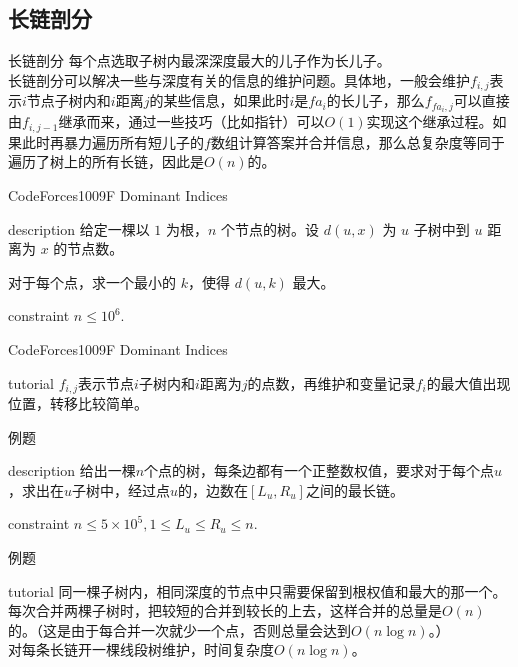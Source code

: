\documentclass{beamer}
\begin{document}
\subsection{长链剖分}
\begin{frame}{长链剖分}
	每个点选取子树内最深深度最大的儿子作为长儿子。\\
	
	长链剖分可以解决一些与深度有关的信息的维护问题。具体地，一般会维护$f_{i,j}$表示$i$节点子树内和$i$距离$j$的某些信息，如果此时$i$是$fa_i$的长儿子，那么$f_{fa_i,j}$可以直接由$f_{i,j-1}$继承而来，通过一些技巧（比如指针）可以$O(1)$实现这个继承过程。如果此时再暴力遍历所有短儿子的$f$数组计算答案并合并信息，那么总复杂度等同于遍历了树上的所有长链，因此是$O(n)$的。
	
\end{frame}
\begin{frame}{CodeForces1009F Dominant Indices}
	\begin{block}{description}
		给定一棵以 $1$ 为根，$n$ 个节点的树。设 $d(u,x)$ 为 $u$ 子树中到 $u$ 距离为 $x$ 的节点数。
		
		对于每个点，求一个最小的 $k$，使得 $d(u,k)$ 最大。
		
	\end{block}
	\begin{block}{constraint}
		$n \le 10^6.$
	\end{block}
\end{frame}
\begin{frame}{CodeForces1009F Dominant Indices}
	\begin{block}{tutorial}
		$f_{i,j}$表示节点$i$子树内和$i$距离为$j$的点数，再维护和变量记录$f_i$的最大值出现位置，转移比较简单。
	\end{block}
\end{frame}


\begin{frame}{例题}
	\begin{block}{description}
		给出一棵$n$个点的树，每条边都有一个正整数权值，要求对于每个点$u$，求出在$u$子树中，经过点$u$的，边数在$[L_u,R_u]$之间的最长链。
	\end{block}
	\begin{block}{constraint}
		$n \le 5\times 10^5, 1 \le L_u \le R_u \le n.$
	\end{block}
\end{frame}
\begin{frame}{例题}
	\begin{block}{tutorial}
		同一棵子树内，相同深度的节点中只需要保留到根权值和最大的那一个。\\
		
		每次合并两棵子树时，把较短的合并到较长的上去，这样合并的总量是$O(n)$的。（这是由于每合并一次就少一个点，否则总量会达到$O(n\log n)$。）\\
		
		对每条长链开一棵线段树维护，时间复杂度$O(n\log n)$。
	\end{block}
\end{frame}
\end{document}

